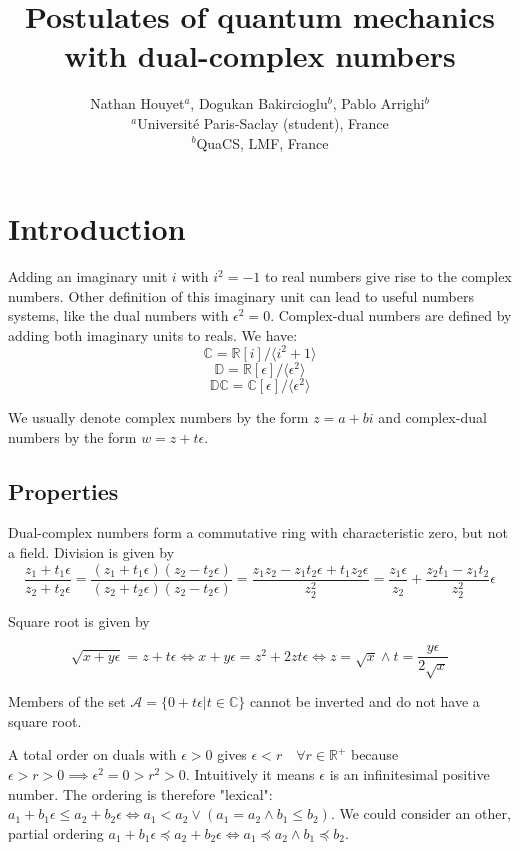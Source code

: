 \documentclass{article}
\title{Postulates of quantum mechanics with dual-complex numbers}
\author{Nathan Houyet$^{a}$, Dogukan Bakircioglu$^{b}$, Pablo Arrighi$^{b}$ \\
        \small $^{a}$Université Paris-Saclay (student), France \\
        \small $^{b}$QuaCS, LMF, France \\
}
\date{}
\newcommand{\R}{\mathbb{R}}
\newcommand{\C}{\mathbb{C}}
\newcommand{\D}{\mathbb{D}}
\newcommand{\DC}{\mathbb{DC}}
\newcommand{\A}{\mathcal{A}}
\newcommand{\e}{\epsilon}
\begin{document}
\maketitle

\section{Introduction}
\noindent Adding an imaginary unit $i$ with $i^2 = -1$ to real numbers give rise to the complex numbers. Other definition of this imaginary unit can lead to useful numbers systems, like the dual numbers with $\e^2 = 0$. Complex-dual numbers are defined by adding both imaginary units to reals. We have: \\

\begin{equation}
\C = \R [i]/\langle i^2+1 \rangle
\end{equation}
\begin{equation}
\D = \R [\e]/\langle \e^2 \rangle
\end{equation}
\begin{equation}
\DC = \C [\e]/\langle \e^2 \rangle
\end{equation}

We usually denote complex numbers by the form $z = a + bi$ and complex-dual numbers by the form $w = z + t\e$.

\subsection{Properties}

Dual-complex numbers form a commutative ring with characteristic zero, but not a field. Division is given by
\begin{equation}
\frac{z_1 + t_1 \e}{z_2 + t_2 \e} = \frac{(z_1 + t_1 \e)(z_2 - t_2 \e)}{(z_2 + t_2 \e)(z_2 - t_2 \e)} = \frac{z_1 z_2 - z_1 t_2 \e + t_1 z_2 \e}{z_2^2} = \frac{z_1\e}{z_2} + \frac{z_2 t_1 - z_1 t_2 }{z_2^2} \e
\end{equation}

Square root is given by

\begin{equation}
\sqrt{x + y \e} = z + t \e \iff x + y \e = z^2 + 2 z t \e \iff z = \sqrt{x} \land t = \frac{y \e}{2 \sqrt{x}}
\end{equation}

Members of the set $\A = \{0 + t \e | t \in \C\}$ cannot be inverted and do not have a square root.

A total order on duals with $\e > 0$ gives $\e < r \quad \forall r \in \R^+$ because $\e > r > 0 \implies \e^2 = 0 > r^2 > 0$. Intuitively it means $\e$ is an infinitesimal positive number. The ordering is therefore "lexical": $a_1 + b_1 \e \leq a_2 + b_2 \e \iff a_1 < a_2 \lor (a_1 = a_2 \land b_1 \leq b_2)$. We could consider an other, partial ordering $a_1 + b_1 \e \preceq a_2 + b_2 \e \iff a_1 \preceq a_2 \land b_1 \preceq b_2$.
\end{document}
